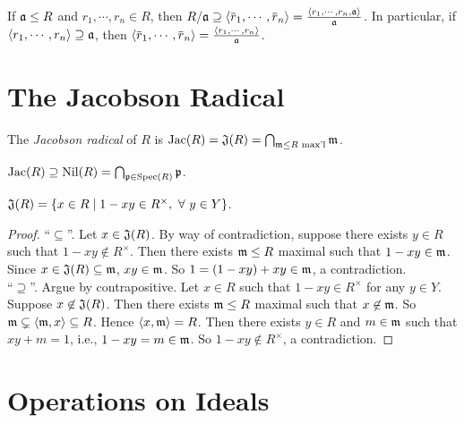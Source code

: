 \begin{fact*}
    If $\mathfrak{a} \leq R$ and $r_1,\cdots,r_n \in R$, then $R/\ffa \supseteq \langle \overbar r_1,\cdots,\overbar r_n \rangle = \frac{\langle r_1,\cdots,r_n, \ffa \rangle}{\ffa}$. In particular, if $\langle r_1,\cdots,r_n \rangle \supseteq \mathfrak{a}$, then $\langle \overbar r_1, \cdots, \overbar r_n \rangle = \frac{\langle r_1,\cdots,r_n \rangle}{\ffa}$.
\end{fact*}

\section*{The Jacobson Radical}

\begin{definition}
    The \emph{Jacobson radical} of $R$ is $\operatorname{Jac}(R) = \mathfrak{J}(R) = \bigcap_{\mathfrak{m} \leq R \text{ max'l}}\mathfrak{m}$.
\end{definition}

\begin{fact}
    $\operatorname{Jac}(R) \supseteq \operatorname{Nil}(R) = \bigcap_{\mathfrak{p} \in \operatorname{Spec}(R)}\mathfrak{p}$.
\end{fact}

\begin{proposition}
    $\mathfrak{J}(R) = \{x \in R \mid 1-xy \in R^\times, \ \forall \  y \in Y\}$.
\end{proposition}

\begin{proof}
    ``$\subseteq$''. Let $x \in \mathfrak{J}(R)$. By way of contradiction, suppose there exists $y \in R$ such that $1-xy \not \in R^\times$. Then there exists $\mathfrak{m} \leq R$ maximal such that $1-xy \in \mathfrak{m}$. Since $x \in \mathfrak{J}(R) \subseteq \mathfrak{m}$, $xy \in \mathfrak{m}$. So $1 = (1-xy) + xy \in \mathfrak{m}$, a contradiction. \\
    ``$\supseteq$''. Argue by contrapositive. Let $x \in R$ such that $1-xy \in R^\times$ for any $y \in Y$. Suppose $x \not \in \mathfrak{J}(R)$. Then there exists $\mathfrak{m} \leq R$ maximal such that $x \not \in \mathfrak{m}$. So $\mathfrak{m} \subsetneq \langle \mathfrak{m}, x \rangle \subseteq R$. Hence $\langle x,\mathfrak{m} \rangle = R$. Then there exists $y \in R$ and $m \in \mathfrak{m}$ such that $xy+m = 1$, i.e., $1-xy = m \in \mathfrak{m}$. So $1-xy \not \in R^\times$, a contradiction.
\end{proof}

\section*{Operations on Ideals}

